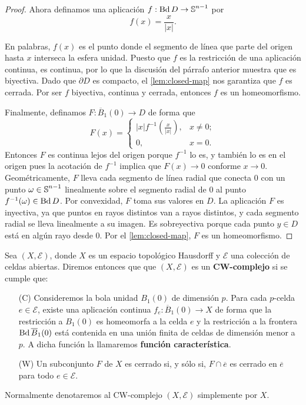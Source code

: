\begin{proof}
	Ahora definamos una aplicación $f : \operatorname{Bd} D \to \operatorname{\mathbb{S}}^{n-1}$ por
	\[
	f(x) = \frac{x}{|x|}.
	\]
	
	En palabras, $f(x)$ es el punto donde el segmento de línea que parte del
	origen hasta $x$ interseca la esfera unidad. Puesto que $f$ es la restricción de
	una aplicación continua, es continua, por lo que la discusión del párrafo anterior
	muestra que es biyectiva. Dado que $\partial D$ es compacto, el \autoref{lem:closed-map} nos garantiza que $f$ es cerrada. Por ser $f$ biyectiva, continua y cerrada, entonces $f$ es un homeomorfismo.
	
	Finalmente, definamos $F : \overline{B}_{1}(0) \to D$ de forma que
	\[
	F(x) =
	\begin{cases}
		|x| f^{-1}\left( \frac{x}{|x|}\right), & x \neq 0; \\
		0,                                     & x = 0.
	\end{cases}
	\]
	Entonces $F$ es continua lejos del origen porque $f^{-1}$ lo es, y también lo es
	en el origen pues la acotación de $f^{-1}$ implica que $F(x) \to 0$ conforme $x
	\to 0$. Geométricamente, $F$ lleva cada segmento de línea radial que conecta $0$
	con un punto $\omega \in \operatorname{\mathbb{S}}^{n-1}$ linealmente sobre el segmento radial de
	$0$ al punto $f^{-1}(\omega) \in \operatorname{Bd} D$. Por convexidad, $F$ toma sus valores en
	$D$. La aplicación $F$ es inyectiva, ya que puntos en rayos distintos van a rayos
	distintos, y cada segmento radial se lleva linealmente a su imagen. Es sobreyectiva
	porque cada punto $y \in D$ está en algún rayo desde $0$. Por el
	\autoref{lem:closed-map}, $F$ es un homeomorfismo.
\end{proof}

\begin{definicion}
	Sea $(X,\mathcal{E})$, donde $X$ es un espacio topológico Hausdorff y
	$\mathcal{E}$ una colección de celdas abiertas. Diremos entonces que que $(X,\mathcal{E}
	)$ es un \textbf{CW-complejo} si se cumple que:
	\begin{enumerate}[font=\bfseries]
		\item[(C)] Consideremos la bola unidad $B_1(0)$ de dimensión $p$. Para cada $p$-celda $e \in \mathcal{E}$, existe una aplicación
		continua $f_{e} : \overline{B}_1(0) \to X$ de forma que la restricción a $B_1(0)$ es
		homeomorfa a la celda $e$ y la restricción a la frontera $\operatorname{Bd} \overline{B}_1(0)$ está contenida en una unión
		finita de celdas de dimensión menor a $p$. A dicha función la llamaremos \textbf{función
			característica}.
		
		\item[(W)] Un subconjunto $F$ de $X$ es cerrado si, y sólo si, $F \cap \overline{e}$ es cerrado en $\overline{e}$ para todo $e \in \mathcal{E}$.
	\end{enumerate}
	Normalmente denotaremos al CW-complejo $(X,\mathcal{E})$ simplemente por $X$.
\end{definicion}

